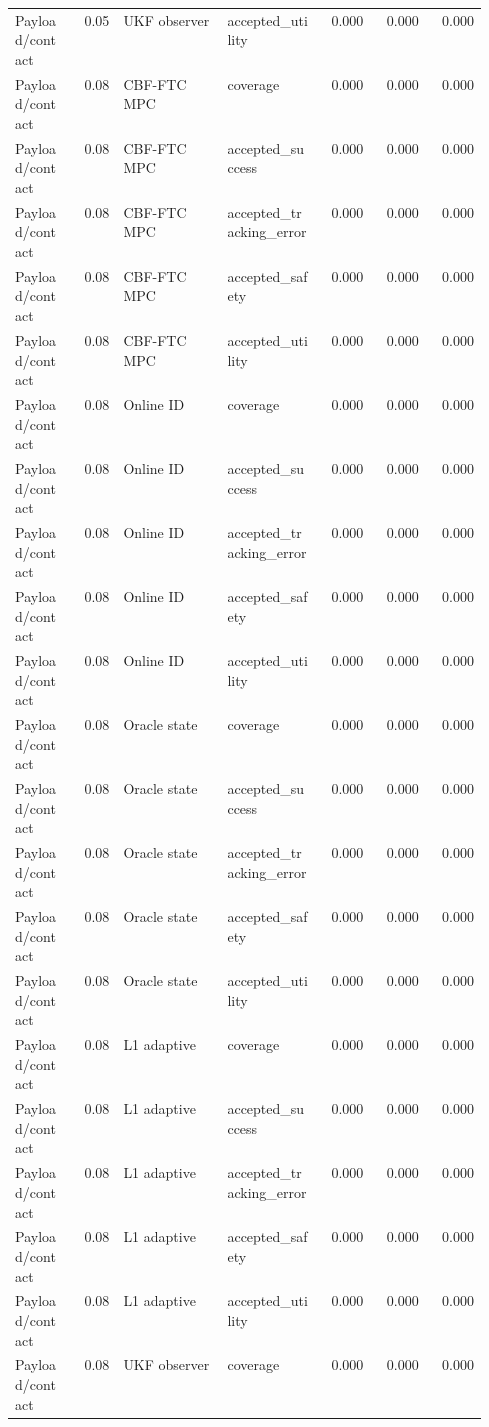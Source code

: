 \documentclass{article}
\begin{document}
\begin{center}
\begin{longtable}{p{0.13\linewidth}rp{0.22\linewidth}p{0.20\linewidth}rrr}
Payload/contact & 0.05 & UKF observer & accepted\_utility & 0.000 & 0.000 & 0.000\\
Payload/contact & 0.08 & CBF-FTC MPC & coverage & 0.000 & 0.000 & 0.000\\
Payload/contact & 0.08 & CBF-FTC MPC & accepted\_success & 0.000 & 0.000 & 0.000\\
Payload/contact & 0.08 & CBF-FTC MPC & accepted\_tracking\_error & 0.000 & 0.000 & 0.000\\
Payload/contact & 0.08 & CBF-FTC MPC & accepted\_safety & 0.000 & 0.000 & 0.000\\
Payload/contact & 0.08 & CBF-FTC MPC & accepted\_utility & 0.000 & 0.000 & 0.000\\
Payload/contact & 0.08 & Online ID & coverage & 0.000 & 0.000 & 0.000\\
Payload/contact & 0.08 & Online ID & accepted\_success & 0.000 & 0.000 & 0.000\\
Payload/contact & 0.08 & Online ID & accepted\_tracking\_error & 0.000 & 0.000 & 0.000\\
Payload/contact & 0.08 & Online ID & accepted\_safety & 0.000 & 0.000 & 0.000\\
Payload/contact & 0.08 & Online ID & accepted\_utility & 0.000 & 0.000 & 0.000\\
Payload/contact & 0.08 & Oracle state & coverage & 0.000 & 0.000 & 0.000\\
Payload/contact & 0.08 & Oracle state & accepted\_success & 0.000 & 0.000 & 0.000\\
Payload/contact & 0.08 & Oracle state & accepted\_tracking\_error & 0.000 & 0.000 & 0.000\\
Payload/contact & 0.08 & Oracle state & accepted\_safety & 0.000 & 0.000 & 0.000\\
Payload/contact & 0.08 & Oracle state & accepted\_utility & 0.000 & 0.000 & 0.000\\
Payload/contact & 0.08 & L1 adaptive & coverage & 0.000 & 0.000 & 0.000\\
Payload/contact & 0.08 & L1 adaptive & accepted\_success & 0.000 & 0.000 & 0.000\\
Payload/contact & 0.08 & L1 adaptive & accepted\_tracking\_error & 0.000 & 0.000 & 0.000\\
Payload/contact & 0.08 & L1 adaptive & accepted\_safety & 0.000 & 0.000 & 0.000\\
Payload/contact & 0.08 & L1 adaptive & accepted\_utility & 0.000 & 0.000 & 0.000\\
Payload/contact & 0.08 & UKF observer & coverage & 0.000 & 0.000 & 0.000\\

\end{longtable}
\end{center}
\end{document}
